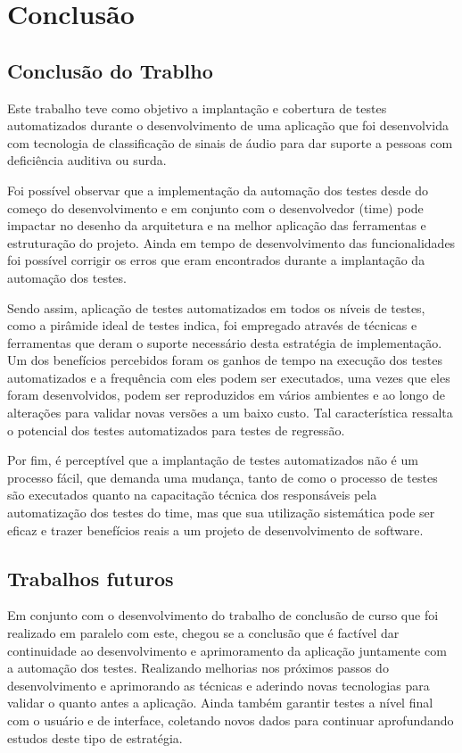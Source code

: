 \chapter{Conclusão}



\section{Conclusão do Trablho}

Este trabalho teve como objetivo a implantação e cobertura de testes automatizados durante o desenvolvimento de uma aplicação que foi desenvolvida com tecnologia de classificação de sinais de áudio para dar suporte a pessoas com deficiência auditiva ou surda.

Foi possível observar que a implementação da automação dos testes desde do começo do desenvolvimento e em conjunto com o desenvolvedor (time) pode impactar no desenho da arquitetura e na melhor aplicação das ferramentas e estruturação do projeto. Ainda em tempo de desenvolvimento das funcionalidades foi possível corrigir os erros que eram encontrados durante a implantação da automação dos testes.

Sendo assim, aplicação de testes automatizados em todos os níveis de testes, como a pirâmide ideal de testes indica, foi empregado através de técnicas e ferramentas que deram o suporte necessário desta estratégia de implementação. Um dos benefícios percebidos foram os ganhos de tempo na execução dos testes automatizados e a frequência com eles podem ser executados, uma vezes que eles foram desenvolvidos, podem ser reproduzidos em vários ambientes e ao longo de alterações para validar novas versões a um baixo custo. Tal característica ressalta o potencial dos testes automatizados para testes de regressão.

Por fim,  é perceptível que a implantação de testes automatizados não é um processo fácil, que demanda uma mudança, tanto de como o processo de testes são executados quanto na capacitação  técnica dos responsáveis pela automatização dos testes do time, mas que sua utilização sistemática pode ser eficaz e trazer benefícios reais a um projeto de desenvolvimento de software. 


\section{Trabalhos futuros}

Em conjunto com o desenvolvimento do trabalho de conclusão de curso que foi realizado em paralelo com este, chegou se a conclusão que é factível dar continuidade ao desenvolvimento e aprimoramento da aplicação juntamente com a automação dos testes. Realizando melhorias nos próximos passos do desenvolvimento e aprimorando as técnicas e aderindo novas tecnologias para validar o quanto antes a aplicação. Ainda também garantir testes a nível final com o usuário e de interface, coletando novos dados para continuar aprofundando estudos deste tipo de estratégia.
